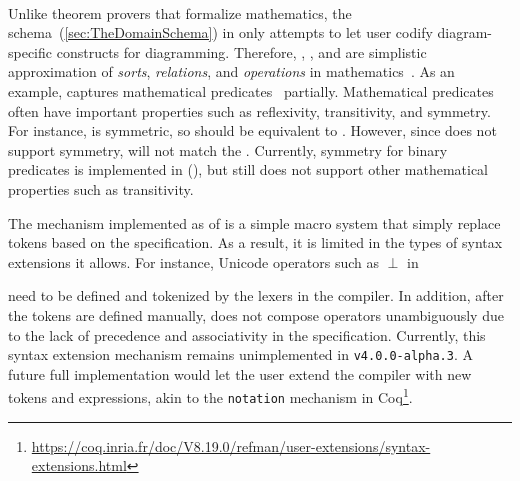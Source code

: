 \paragraph{\inlineDSL{\Domain{}}} Unlike theorem provers that formalize mathematics, the \Domain{} schema~(\cref{sec:TheDomainSchema}) in \Penrose{} only attempts to let user codify diagram-specific constructs for diagramming. Therefore, , , and  are simplistic approximation of \emph{sorts}, \emph{relations}, and \emph{operations} in mathematics~\cite{avigad_design_2020}. As an example, \Domain{}  captures mathematical predicates~\cite{stoll_set_2012} partially. Mathematical predicates often have important properties such as reflexivity, transitivity, and symmetry. For instance,  is symmetric, so  should be equivalent to . However, since \Penrose{} does not support symmetry,  will not match the . Currently, symmetry for binary predicates is implemented in \Penrose{} (), but \Penrose{} still does not support other mathematical properties such as transitivity.

The  mechanism implemented as of \cite{penrose} is a simple macro system that simply replace tokens based on the specification. As a result, it is limited in the types of syntax extensions it allows. For instance, Unicode operators such as $\perp$ in 

\begin{center}
\end{center}

\noindent need to be defined and tokenized by the lexers in the \Penrose{} compiler. In addition, after the tokens are defined manually,   does not compose operators unambiguously due to the lack of precedence and associativity in the specification. Currently, this syntax extension mechanism remains unimplemented in \Penrose{} \texttt{v4.0.0-alpha.3}. A future full implementation would let the user extend the compiler with new tokens and expressions, akin to the \texttt{notation} mechanism in Coq\footnote{\url{https://coq.inria.fr/doc/V8.19.0/refman/user-extensions/syntax-extensions.html}}. 

